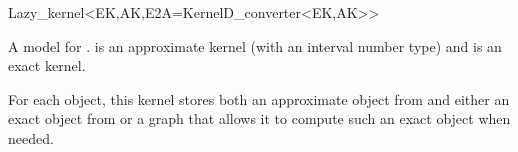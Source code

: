 \begin{ccRefClass}{Lazy_kernel<EK,AK,E2A=KernelD_converter<EK,AK>>}

\ccDefinition
A model for .
 is an approximate kernel (with an interval number type) and 
is an exact kernel.

\ccIsModel
{}

\ccImplementation
For each object, this kernel stores both an approximate object from
 and either an exact object from  or a graph that
allows it to compute such an exact object when needed.

\end{ccRefClass}
